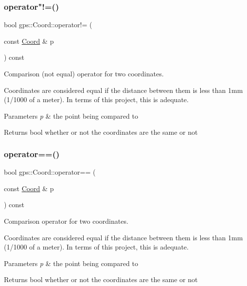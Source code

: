 \subsubsection{\texorpdfstring{operator"!=()}{operator!=()}}
{\footnotesize\ttfamily bool gps\+::\+Coord\+::operator!= (\begin{DoxyParamCaption}\item[{const \hyperlink{classgps_1_1Coord}{Coord} \&}]{p }\end{DoxyParamCaption}) const}

Comparison (not equal) operator for two coordinates.

Coordinates are considered equal if the distance between them is less than 1mm (1/1000 of a meter). In terms of this project, this is adequate.


\begin{DoxyParams}{Parameters}
{\em p} & the point being compared to \\
\hline
\end{DoxyParams}
\begin{DoxyReturn}{Returns}
bool whether or not the coordinates are the same or not 
\end{DoxyReturn}
\mbox{\label{classgps_1_1Coord_a254245e5cdfbac96a1c6e0332f2d65fb}} 
\subsubsection{\texorpdfstring{operator==()}{operator==()}}
{\footnotesize\ttfamily bool gps\+::\+Coord\+::operator== (\begin{DoxyParamCaption}\item[{const \hyperlink{classgps_1_1Coord}{Coord} \&}]{p }\end{DoxyParamCaption}) const}

Comparison operator for two coordinates.

Coordinates are considered equal if the distance between them is less than 1mm (1/1000 of a meter). In terms of this project, this is adequate.


\begin{DoxyParams}{Parameters}
{\em p} & the point being compared to \\
\hline
\end{DoxyParams}
\begin{DoxyReturn}{Returns}
bool whether or not the coordinates are the same or not 
\end{DoxyReturn}
\mbox{\label{classgps_1_1Coord_a43b8263439170e923db7b21a32b653f8}} 
